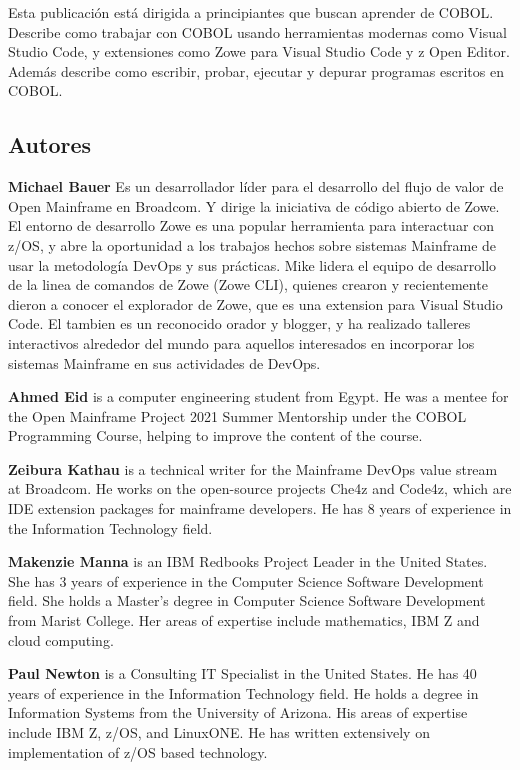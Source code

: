Esta publicación está dirigida a principiantes que buscan aprender
de COBOL. Describe como trabajar con COBOL usando herramientas modernas
como Visual Studio Code, y extensiones como Zowe para Visual Studio Code
y z Open Editor. Además describe como escribir, probar, ejecutar y 
depurar programas escritos en COBOL.

\hypertarget{authors}{%
\subsection*{Autores}\label{authors}}

\textbf{Michael Bauer} Es un desarrollador líder para el desarrollo
del flujo de valor de Open Mainframe en Broadcom. Y dirige la iniciativa
de código abierto de Zowe. El entorno de desarrollo Zowe es una popular
herramienta para interactuar con z/OS, y abre la oportunidad a los 
trabajos hechos sobre sistemas Mainframe de usar la metodología DevOps
y sus prácticas. Mike lidera el equipo de desarrollo de la linea de comandos
de Zowe (Zowe CLI), quienes crearon y recientemente dieron a conocer el
explorador de Zowe, que es una extension para Visual Studio Code.
El tambien es un reconocido orador y blogger, y ha realizado talleres
interactivos alrededor del mundo para aquellos interesados en incorporar
los sistemas Mainframe en sus actividades de DevOps.

\textbf{Ahmed Eid} is a computer engineering student from Egypt. He was 
a mentee for the Open Mainframe Project 2021 Summer Mentorship under the 
COBOL Programming Course, helping to improve the content of the course.

\textbf{Zeibura Kathau} is a technical writer for the Mainframe DevOps
value stream at Broadcom. He works on the open-source projects Che4z and 
Code4z, which are IDE extension packages for mainframe developers. He has 
8 years of experience in the Information Technology field.

\textbf{Makenzie Manna} is an IBM Redbooks Project Leader in the United
States. She has 3 years of experience in the Computer Science Software
Development field. She holds a Master's degree in Computer Science
Software Development from Marist College. Her areas of expertise include
mathematics, IBM Z and cloud computing.

\textbf{Paul Newton} is a Consulting IT Specialist in the United States.
He has 40 years of experience in the Information Technology field. He
holds a degree in Information Systems from the University of Arizona.
His areas of expertise include IBM Z, z/OS, and LinuxONE. He has written
extensively on implementation of z/OS based technology.

